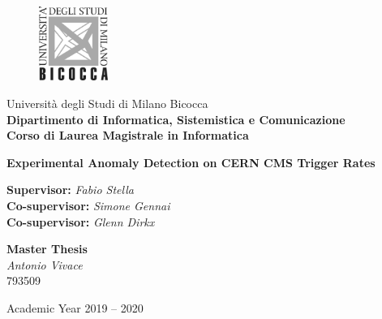 
\thispagestyle{empty}
\addtocounter{page}{-1}

	\begin{figure}
		\vspace*{-8mm}
		\centering
		\includegraphics[width=0.20\textwidth]{logo-milano-bicocca.jpg}
	\end{figure}
	\large \noindent Università degli Studi di Milano Bicocca \\
	\textbf{Dipartimento di Informatica, Sistemistica e Comunicazione \\
			Corso di Laurea Magistrale in Informatica}

\vfill


\begin{center}
	{\Huge \textbf{Experimental Anomaly Detection on CERN CMS Trigger Rates}}
\end{center}

\vfill

\begin{flushleft}
	{\Large \textbf{Supervisor:} \textit{Fabio Stella} \\
	 \textbf{Co-supervisor:} \textit{Simone Gennai} \\
	 \textbf{Co-supervisor:} \textit{Glenn Dirkx}}
\end{flushleft}

\vspace{8mm}
\par

\begin{flushright}
	{\Large \textbf{Master Thesis} \\
			\textit{Antonio Vivace} \\ 793509}
\end{flushright}

\vfill
\par

\begin{center}
	{\large Academic Year 2019 -- 2020}
\end{center}

\clearpage